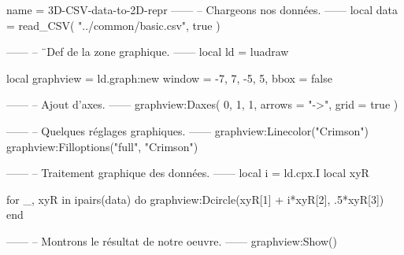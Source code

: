 \documentclass[border = 3pt]{standalone}
\begin{document}
\begin{luadraw*}{name = 3D-CSV-data-to-2D-repr}
------
-- Chargeons nos données.
------
local data = read_CSV(
  "../common/basic.csv",
  true
)

------
-- ¨Def de la zone graphique.
------
local ld = luadraw

local graphview = ld.graph:new{
  window = {-7, 7, -5, 5},
  bbox   = false
}

------
-- Ajout d'axes.
------
graphview:Daxes(
  {0, 1, 1},
  {
    arrows = "->",
    grid   = true
  }
)

------
-- Quelques réglages graphiques.
------
graphview:Linecolor("Crimson")
graphview:Filloptions("full", "Crimson")

------
-- Traitement graphique des données.
------
local i = ld.cpx.I
local xyR

for _, xyR in ipairs(data) do
  graphview:Dcircle(xyR[1] + i*xyR[2], .5*xyR[3])
end

------
-- Montrons le résultat de notre oeuvre.
------
graphview:Show()
\end{luadraw*}
\end{document}
